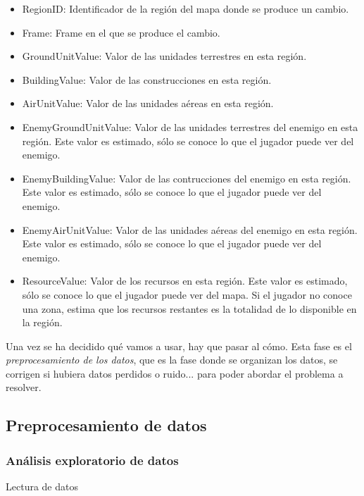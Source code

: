\documentclass[a4paper,11pt]{book}\usepackage[]{graphicx}\usepackage[]{color}
\begin{document}
\begin{itemize}
\begin{itemize}
    \item RegionID: Identificador de la región del mapa donde se produce un cambio.
    \item Frame: Frame en el que se produce el cambio.
    \item GroundUnitValue: Valor de las unidades terrestres en esta región.
    \item BuildingValue: Valor de las construcciones en esta región.
    \item AirUnitValue: Valor de las unidades aéreas en esta región.
    \item EnemyGroundUnitValue: Valor de las unidades terrestres del enemigo en esta región. Este valor es estimado, sólo se conoce lo que el jugador puede ver del enemigo.
    \item EnemyBuildingValue: Valor de las contrucciones del enemigo en esta región. Este valor es estimado, sólo se conoce lo que el jugador puede ver del enemigo.
    \item EnemyAirUnitValue: Valor de las unidades aéreas del enemigo en esta región. Este valor es estimado, sólo se conoce lo que el jugador puede ver del enemigo.
    \item ResourceValue: Valor de los recursos en esta región. Este valor es estimado, sólo se conoce lo que el jugador puede ver del mapa. Si el jugador no conoce una zona, estima que los recursos restantes es la totalidad de lo disponible en la región.
  \end{itemize}
\end{itemize}

Una vez se ha decidido qué vamos a usar, hay que pasar al cómo. Esta fase es el \emph{preprocesamiento de los datos}, que es la fase donde se organizan los datos, se corrigen si hubiera datos perdidos o ruido... para poder abordar el problema a resolver.

\subsection{Preprocesamiento de datos}

\subsubsection{Análisis exploratorio de datos}

Lectura de datos
\end{document}
